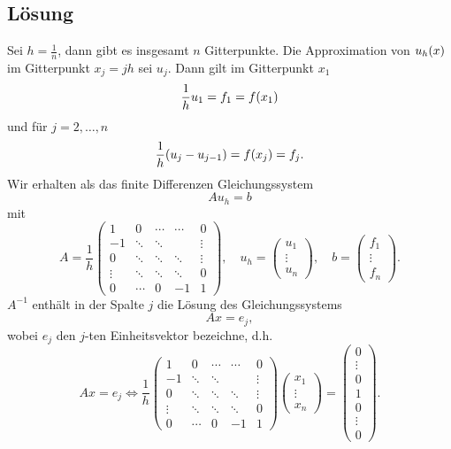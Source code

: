 \documentclass{exercise}
\begin{document}
    \subsection*{Lösung}
    Sei \(h = \frac{1}{n}\), dann gibt es insgesamt \(n\) Gitterpunkte.
    Die Approximation von \(u_h\parentheses*{x}\) im Gitterpunkt \(x_j = jh\) sei \(u_j\).
    Dann gilt im Gitterpunkt \(x_1\)
    \[
        \frac{1}{h}u_1 = f_1 = f\parentheses*{x_1}
    \]
    und für \(j = 2, \ldots, n\)
    \[
        \frac{1}{h}\parentheses*{u_j - u_{j - 1}} = f\parentheses*{x_j} = f_j.
    \]
    Wir erhalten als das finite Differenzen Gleichungssystem
    \[
        Au_h = b
    \]
    mit
    \[
        A = \frac{1}{h}\begin{pmatrix}
            1 & 0 & \cdots & \cdots & 0\\
            -1 & \ddots & \ddots & & \vdots\\
            0 & \ddots & \ddots & \ddots & \vdots\\
            \vdots & \ddots & \ddots & \ddots & 0\\
            0 & \cdots & 0 & -1 & 1
        \end{pmatrix}, \quad u_h = \begin{pmatrix}
            u_1\\\vdots\\u_n
        \end{pmatrix}, \quad b = \begin{pmatrix}
            f_1\\\vdots\\f_n
        \end{pmatrix}.
    \]
    \(A^{-1}\) enthält in der Spalte \(j\) die Lösung des Gleichungssystems
    \[
        Ax = e_j,
    \]
    wobei \(e_j\) den \(j\)-ten Einheitsvektor bezeichne, d.h.
    \[
        Ax = e_j \iff \frac{1}{h}\begin{pmatrix}
            1 & 0 & \cdots & \cdots & 0\\
            -1 & \ddots & \ddots & & \vdots\\
            0 & \ddots & \ddots & \ddots & \vdots\\
            \vdots & \ddots & \ddots & \ddots & 0\\
            0 & \cdots & 0 & -1 & 1
        \end{pmatrix}\begin{pmatrix}
            x_1\\\vdots\\x_n
        \end{pmatrix} = \begin{pmatrix}
            0\\\vdots\\0\\1\\0\\\vdots\\0
        \end{pmatrix}.
    \]
\end{document}
